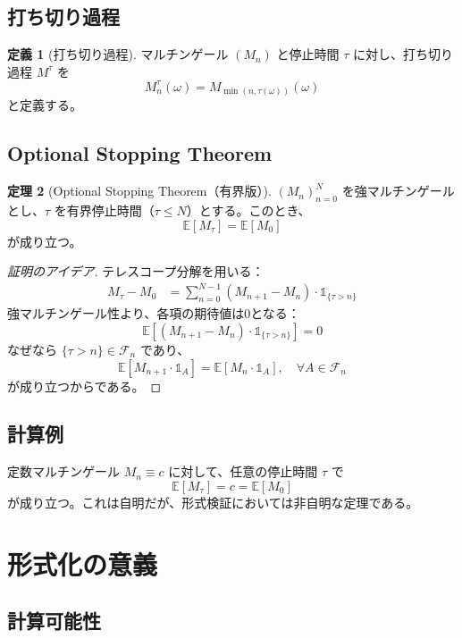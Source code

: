\documentclass[a4paper,12pt]{ltjsarticle}
\theoremstyle{definition}
\newtheorem{definition}{定義}[section]
\newtheorem{theorem}[definition]{定理}
\begin{document}
\subsection{打ち切り過程}

\begin{definition}[打ち切り過程]
マルチンゲール $(M_n)$ と停止時間 $\tau$ に対し、打ち切り過程 $M^\tau$ を
\[
M^\tau_n(\omega) = M_{\min(n, \tau(\omega))}(\omega)
\]
と定義する。
\end{definition}

\subsection{Optional Stopping Theorem}

\begin{theorem}[Optional Stopping Theorem（有界版）]
$(M_n)_{n=0}^N$ を強マルチンゲールとし、$\tau$ を有界停止時間（$\tau \leq N$）とする。このとき、
\[
\mathbb{E}[M_\tau] = \mathbb{E}[M_0]
\]
が成り立つ。
\end{theorem}

\begin{proof}[証明のアイデア]
テレスコープ分解を用いる：
\begin{align*}
M_\tau - M_0 &= \sum_{n=0}^{N-1} (M_{n+1} - M_n) \cdot \mathbb{1}_{\{\tau > n\}}
\end{align*}
強マルチンゲール性より、各項の期待値は0となる：
\[
\mathbb{E}[(M_{n+1} - M_n) \cdot \mathbb{1}_{\{\tau > n\}}] = 0
\]
なぜなら $\{\tau > n\} \in \mathcal{F}_n$ であり、
\[
\mathbb{E}[M_{n+1} \cdot \mathbb{1}_A] = \mathbb{E}[M_n \cdot \mathbb{1}_A], \quad \forall A \in \mathcal{F}_n
\]
が成り立つからである。
\end{proof}

\subsection{計算例}

定数マルチンゲール $M_n \equiv c$ に対して、任意の停止時間 $\tau$ で
\[
\mathbb{E}[M_\tau] = c = \mathbb{E}[M_0]
\]
が成り立つ。これは自明だが、形式検証においては非自明な定理である。

\section{形式化の意義}

\subsection{計算可能性}
\end{document}
